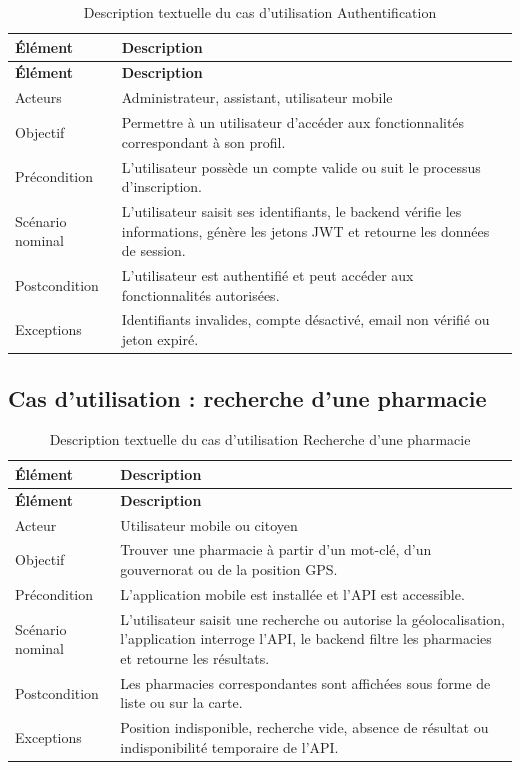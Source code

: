 \begin{longtable}{L{4cm}L{10cm}}
    \caption{Description textuelle du cas d'utilisation Authentification}\\
    \toprule
    \textbf{Élément} & \textbf{Description} \\
    \midrule
    \endfirsthead
    \toprule
    \textbf{Élément} & \textbf{Description} \\
    \midrule
    \endhead
    Acteurs & Administrateur, assistant, utilisateur mobile \\
    Objectif & Permettre à un utilisateur d'accéder aux fonctionnalités correspondant à son profil. \\
    Précondition & L'utilisateur possède un compte valide ou suit le processus d'inscription. \\
    Scénario nominal & L'utilisateur saisit ses identifiants, le backend vérifie les informations, génère les jetons JWT et retourne les données de session. \\
    Postcondition & L'utilisateur est authentifié et peut accéder aux fonctionnalités autorisées. \\
    Exceptions & Identifiants invalides, compte désactivé, email non vérifié ou jeton expiré. \\
    \bottomrule
\end{longtable}

\subsection{Cas d'utilisation : recherche d'une pharmacie}

\begin{longtable}{L{4cm}L{10cm}}
    \caption{Description textuelle du cas d'utilisation Recherche d'une pharmacie}\\
    \toprule
    \textbf{Élément} & \textbf{Description} \\
    \midrule
    \endfirsthead
    \toprule
    \textbf{Élément} & \textbf{Description} \\
    \midrule
    \endhead
    Acteur & Utilisateur mobile ou citoyen \\
    Objectif & Trouver une pharmacie à partir d'un mot-clé, d'un gouvernorat ou de la position GPS. \\
    Précondition & L'application mobile est installée et l'API est accessible. \\
    Scénario nominal & L'utilisateur saisit une recherche ou autorise la géolocalisation, l'application interroge l'API, le backend filtre les pharmacies et retourne les résultats. \\
    Postcondition & Les pharmacies correspondantes sont affichées sous forme de liste ou sur la carte. \\
    Exceptions & Position indisponible, recherche vide, absence de résultat ou indisponibilité temporaire de l'API. \\
    \bottomrule
\end{longtable}

